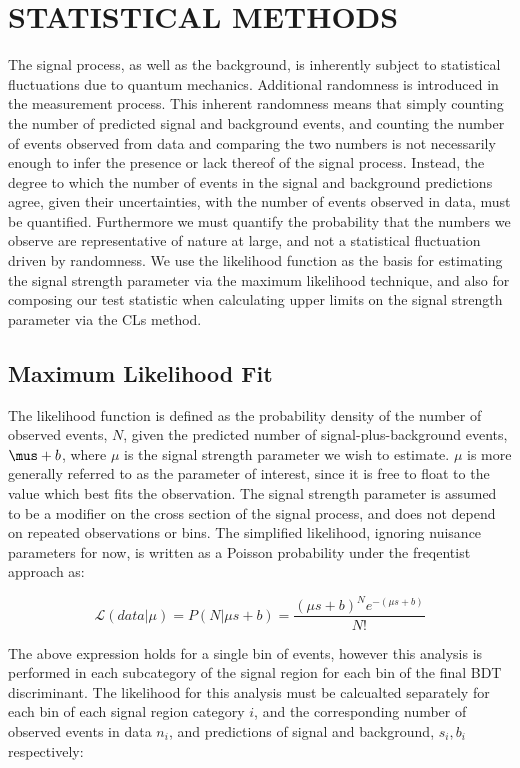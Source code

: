 %
%

\chapter{STATISTICAL METHODS}
\label{chap:stats}
The \tth signal process, as well as the background, is inherently subject to statistical fluctuations due to quantum mechanics.
Additional randomness is introduced in the measurement process. This inherent randomness means that simply counting the number of predicted
signal and background events, and counting the number of events observed from data and comparing the two numbers is not necessarily enough to infer the presence or
lack thereof of the \tth signal process. Instead, the degree to which the
number of events in the signal and background predictions agree, given their uncertainties, with the number of events observed in data, must be quantified.
Furthermore we must quantify the probability that the numbers we observe are representative of nature at large, and not a statistical fluctuation driven by randomness. 
We use the likelihood function as the basis for estimating the signal strength parameter via the maximum likelihood technique, and also for composing our test statistic when
calculating upper limits  on the signal strength parameter via the CLs method. 


\section{Maximum Likelihood Fit}
\label{sec:fit}
The likelihood function is defined as the probability density of the number of observed events, $N$, given the predicted number of signal-plus-background events, $\mus + b$,
where $\mu$ is the signal strength parameter we wish to estimate. $\mu$ is more generally referred to as the parameter of interest, since it is free to float to the value
which best fits the observation. The signal strength parameter is assumed to be a modifier on the cross section of the \tth signal process, and does not depend on repeated
observations or bins. The simplified likelihood, ignoring nuisance parameters for now, is written as a Poisson probability under the freqentist approach as:

\begin{equation}
\label{eqn:likelihood1}
\mathcal{L}(data|\mu) = P(N|\mu s+b) = \frac{(\mu s+b)^{N}e^{-(\mu s+b)}}{N!}
\end{equation}

\noindent The above expression holds for a single bin of events, however this analysis is performed in each subcategory of the signal
region for each bin of the final BDT discriminant. The likelihood for this analysis must be calcualted separately for each bin of each signal region category $i$, and
the corresponding number of observed events in data $n_{i}$, and predictions of signal and background, $s_{i}, b_{i}$ respectively:

